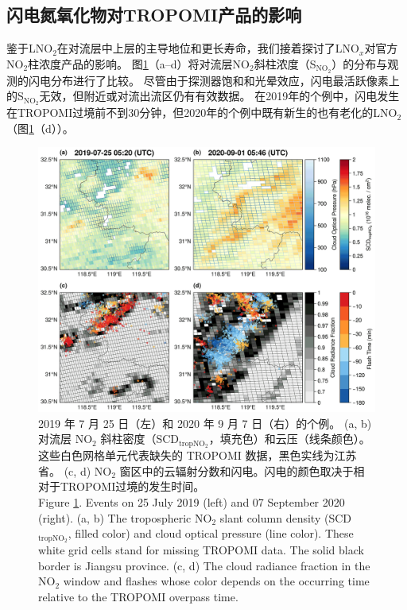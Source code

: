 \subsection{闪电氮氧化物对TROPOMI产品的影响}  \label{subsect:lnox_affects_tropomi}

鉴于LNO$_2$在对流层中上层的主导地位和更长寿命，我们接着探讨了LNO$_x$对官方NO$_2$柱浓度产品的影响。
图\ref{fig:flash_scd}（a--d）将对流层NO$_2$斜柱浓度（S$_{\textrm{NO$_2$}}$）的分布与观测的闪电分布进行了比较。
尽管由于探测器饱和和光晕效应，闪电最活跃像素上的S$_{\textrm{NO$_2$}}$无效，但附近或对流出流区仍有有效数据。
在2019年的个例中，闪电发生在TROPOMI过境前不到30分钟，但2020年的个例中既有新生的也有老化的LNO$_2$（图\ref{fig:flash_scd}（d））。

\begin{figure}[!htbp]
    \centering
    \includegraphics[width=12cm]{./figures/flash_scd.png}
    \caption{
    2019 年 7 月 25 日（左）和 2020 年 9 月 7 日（右）的个例。
    (a, b) 对流层 NO$_2$ 斜柱密度（SCD$_\textrm{tropNO$_2$}$，填充色）和云压（线条颜色）。
    这些白色网格单元代表缺失的 TROPOMI 数据，黑色实线为江苏省。
     (c, d) NO$_2$ 窗区中的云辐射分数和闪电。闪电的颜色取决于相对于TROPOMI过境的发生时间。\\
    Figure \ref{fig:flash_scd}. Events on 25 July 2019 (left) and 07 September 2020 (right).
    (a, b) The tropospheric NO$_2$ slant column density (SCD$_\textrm{tropNO$_2$}$, filled color) and cloud optical pressure (line color).
    These white grid cells stand for missing TROPOMI data.
    The solid black border is Jiangsu province.
    (c, d) The cloud radiance fraction in the NO$_2$ window and flashes whose color depends on the occurring time relative to the TROPOMI overpass time.
    }
    \label{fig:flash_scd}
\end{figure}


